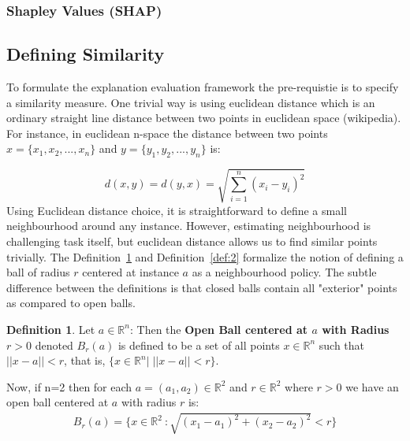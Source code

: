 \documentclass[english]{tktltiki2}
\theoremstyle{definition}
\newtheorem{definition}[thm]{Definition}
\theoremstyle{remark}
\begin{document}
\subsubsection{Shapley Values (SHAP)} %

\subsection{Defining Similarity}\label{sec:defining_similarity} %
To formulate the explanation evaluation framework the pre-requistie is to specify a similarity measure. One trivial way is using euclidean distance which is an ordinary straight line distance between two points in euclidean space (wikipedia). For instance, in euclidean n-space the distance between two points $x = \{x_1, x_2, ..., x_n\}$ and $y = \{y_1, y_2, ..., y_n\}$ is:

\begin{equation}\label{eq:euclidean_distance}
d(x,y) = d(y,x) = \sqrt{\sum_{i=1}^{n}(x_i - y_i)^2}
\end{equation}
Using Euclidean distance choice, it is straightforward to define a small neighbourhood around any instance. However, estimating neighbourhood is challenging task itself, but euclidean distance allows us to find similar points trivially. The Definition~\ref{def:1} and Definition~\ref{def:2} formalize the notion of defining a ball of radius $r$ centered at instance $a$ as a neighbourhood policy. The subtle difference between the definitions is that closed balls contain all "exterior" points as compared to open balls.

\begin{definition}\label{def:1}{Let $a \in {\mathbb{R}}^n$: Then the \textbf{Open Ball centered at $a$ with Radius $r > 0$} denoted $B_{r}(a)$ is defined to be a set of all points $x \in {\mathbb{R}}^n$ such that $||x-a|| < r$, that is, $\{x \in {\mathbb{R}}^n |\;||x - a|| < r\}.$}
\end{definition}
Now, if n=2 then for each $a = (a_1,a_2) \in {\mathbb{R}}^2$ and $r \in {\mathbb{R}}^2$ where $r > 0$ we have an open ball centered at $a$ with radius $r$ is:
\begin{align*}
B_{r}(a) = \{x \in {\mathbb{R}}^2\ : \sqrt{(x_1 - a_1)^2 + (x_2 - a_2)^2} < r\}
\end{align*}
\end{document}
